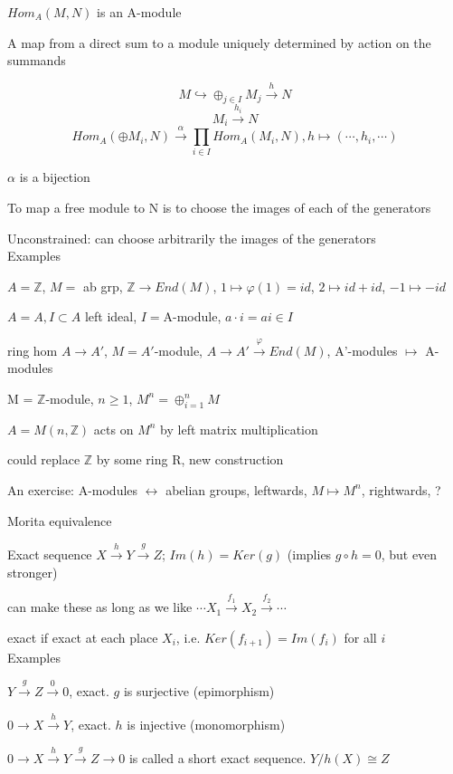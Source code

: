\documentclass[12pt]{article}
\begin{document}
$Hom_A(M, N)$ is an A-module

\noindent
A map from a direct sum to a module uniquely determined by action on the summands

$$M \hookrightarrow \oplus_{j \in I}M_j \xrightarrow{h} N$$ $$M_i \xrightarrow{h_i} N$$ $$Hom_A(\oplus M_i, N) \xrightarrow{\alpha} \prod_{i \in I} Hom_A(M_i, N), h \mapsto (\cdots, h_i, \cdots)$$

$\alpha$ is a bijection

To map a free module to N is to choose the images of each of the generators

Unconstrained: can choose arbitrarily the images of the generators\\

\noindent
Examples

\noindent
$A = \mathds{Z}$, $M =$ ab grp, $\mathds{Z} \to End(M)$, $1 \mapsto \varphi(1) = id$, $2 \mapsto id + id$, $-1 \mapsto -id$

\noindent
$A = A, I \subset A$ left ideal, $I = $A-module, $a \cdot i = ai \in I$

\noindent
ring hom $A \to A'$, $M = A'$-module, $A \to A' \xrightarrow{\varphi} End(M)$, A'-modules $\mapsto$ A-modules

\noindent
M = $\mathds{Z}$-module, $n \geq 1$, $M^n = \oplus_{i = 1}^n M$

$A = M(n, \mathds{Z})$ acts on $M^n$ by left matrix multiplication

could replace $\mathds{Z}$ by some ring R, new construction

An exercise: A-modules $\leftrightarrow$ abelian groups, leftwards, $M \mapsto M^n$, rightwards, ?

Morita equivalence

\noindent
Exact sequence $X \xrightarrow{h} Y \xrightarrow{g} Z$; $Im(h) = Ker(g)$ (implies $g \circ h = 0$, but even stronger)

can make these as long as we like $\cdots X_1 \xrightarrow{f_1} X_2 \xrightarrow{f_2} \cdots$

exact if exact at each place $X_i$, i.e. $Ker(f_{i + 1}) = Im(f_i)$ for all $i$\\

\noindent
Examples

\noindent
$Y \xrightarrow{g} Z \xrightarrow{0} 0$, exact.  $g$ is surjective (epimorphism)

\noindent
$0 \to X \xrightarrow{h} Y$, exact.  $h$ is injective (monomorphism)

\noindent
$0 \to X \xrightarrow{h} Y \xrightarrow{g} Z \to 0$ is called a short exact sequence.  $Y/h(X) \cong Z$
\end{document}
